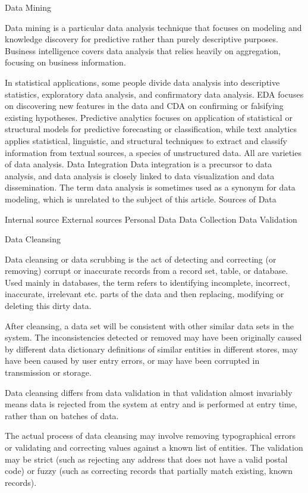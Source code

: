 Data Mining

Data mining is a particular data analysis technique that focuses on modeling and knowledge discovery for predictive rather than purely descriptive purposes. Business intelligence covers data analysis that relies heavily on aggregation, focusing on business information. 

In statistical applications, some people divide data analysis into descriptive statistics, exploratory data analysis, and confirmatory data analysis. EDA focuses on discovering new features in the data and CDA on confirming or falsifying existing hypotheses. Predictive analytics focuses on application of statistical or structural models for predictive forecasting or classification, while text analytics applies statistical, linguistic, and structural techniques to extract and classify information from textual sources, a species of unstructured data. All are varieties of data analysis.
Data Integration
Data integration is a precursor to data analysis, and data analysis is closely linked to data visualization and data dissemination. 
The term data analysis is sometimes used as a synonym for data modeling, which is unrelated to the subject of this article.
Sources of Data

Internal source
External sources
Personal Data
Data Collection
Data Validation


Data Cleansing

Data cleansing or data scrubbing is the act of detecting and correcting (or removing) corrupt or inaccurate records from a record set, table, or database. Used mainly in databases, the term refers to identifying incomplete, incorrect, inaccurate, irrelevant etc. parts of the data and then replacing, modifying or deleting this dirty data.

After cleansing, a data set will be consistent with other similar data sets in the system. The inconsistencies detected or removed may have been originally caused by different data dictionary definitions of similar entities in different stores, may have been caused by user entry errors, or may have been corrupted in transmission or storage.

Data cleansing differs from data validation in that validation almost invariably means data is rejected from the system at entry and is performed at entry time, rather than on batches of data.

The actual process of data cleansing may involve removing typographical errors or validating and correcting values against a known list of entities. The validation may be strict (such as rejecting any address that does not have a valid postal code) or fuzzy (such as correcting records that partially match existing, known records).


